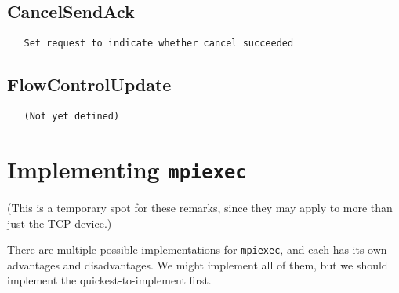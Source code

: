 \documentclass{article}
\def\code#1{\texttt{#1}}
\begin{document}
\subsection{CancelSendAck}
\begin{verbatim}
   Set request to indicate whether cancel succeeded
\end{verbatim}

\subsection{FlowControlUpdate}
\begin{verbatim}
   (Not yet defined)
\end{verbatim}


\section{Implementing \code{mpiexec}}
\label{sec:mpiexec}

(This is a temporary spot for these remarks, since they may apply to more than
just the TCP device.)

There are multiple possible implementations for \code{mpiexec}, and each has
its own advantages and disadvantages.  We might implement all of them, but we
should implement the quickest-to-implement first.
\end{document}
